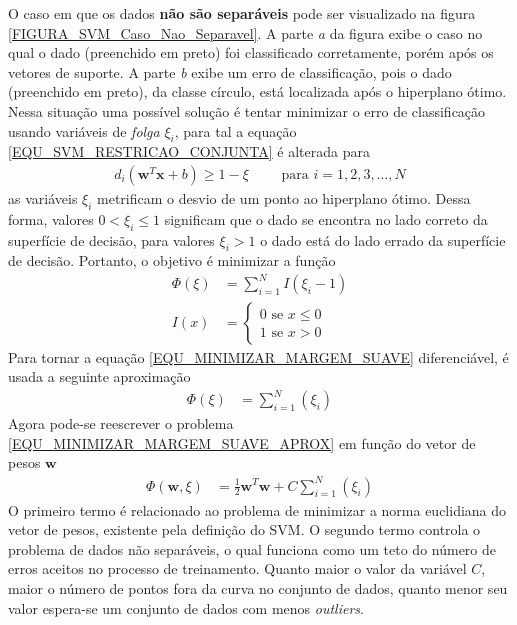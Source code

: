O caso em que os dados \textbf{não são separáveis} pode ser visualizado na figura \ref{FIGURA_SVM_Caso_Nao_Separavel}. A parte \emph{a} da figura exibe o caso no qual o dado (preenchido em preto) foi classificado corretamente, porém após os vetores de suporte. A parte \emph{b} exibe um erro de classificação, pois o dado (preenchido em preto), da classe círculo, está localizada após o hiperplano ótimo. Nessa situação uma possível solução é tentar minimizar o erro de classificação usando variáveis de \emph{folga} \(\xi_{i}\), para tal a equação \eqref{EQU_SVM_RESTRICAO_CONJUNTA} é alterada para 
\begin{align}
d_{i}(\mathbf{w}^{T}\mathbf{x} + b )  \geq 1 - \xi \qquad \textrm{ para } i = 1, 2, 3, \ldots, N
\end{align}
as variáveis \(\xi_{i}\) metrificam o desvio de um ponto ao hiperplano ótimo. Dessa forma, valores \(0 < \xi_{i} \leq 1\) significam que o dado se encontra no lado correto da superfície de decisão, para valores \(\xi_{i} > 1\) o dado está do lado errado da superfície de decisão. Portanto, o objetivo é minimizar a função
\begin{align}
\Phi(\xi) &= \sum\limits_{i=1}^{N}I(\xi_{i} -1) \label{EQU_MINIMIZAR_MARGEM_SUAVE}\\
I(x) 	  &= \begin{cases}
				0 \textrm{ se } x \leq 0 \\
				1 \textrm{ se } x > 0 
			 \end{cases} 
\end{align}
Para tornar a equação \eqref{EQU_MINIMIZAR_MARGEM_SUAVE} diferenciável, é usada a seguinte aproximação
\begin{align}
\Phi(\xi) &= \sum\limits_{i=1}^{N} \left( \xi_{i} \right) \label{EQU_MINIMIZAR_MARGEM_SUAVE_APROX}
\end{align}
Agora pode-se reescrever o problema \eqref{EQU_MINIMIZAR_MARGEM_SUAVE_APROX} em função do vetor de pesos \(\mathbf{w}\)
\begin{align}
\Phi(\mathbf{w}, \xi) &= \frac{1}{2}\mathbf{w}^{T}\mathbf{w} + C\sum\limits_{i=1}^{N} \left( \xi_{i} \right) \label{EQU_MINIMIZAR_MARGEM_SUAVE_APROX_SVM}
\end{align}
O primeiro termo é relacionado ao problema de minimizar a norma euclidiana do vetor de pesos, existente pela definição do SVM. O segundo termo controla o problema de dados não separáveis, o qual funciona como um teto do número de erros aceitos no processo de treinamento. Quanto maior o valor da variável \(C\), maior o número de pontos fora da curva no conjunto de dados, quanto menor seu valor espera-se um conjunto de dados com menos \emph{outliers}.
